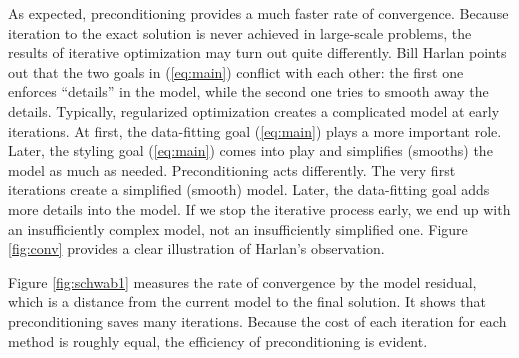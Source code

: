 As expected,
preconditioning provides a much faster rate of convergence.
Because iteration to the exact solution
is never achieved in large-scale problems,
the results of iterative optimization may turn out quite differently.
Bill Harlan points out that the two goals
in (\ref{eq:main}) conflict with each other:
the first one enforces ``details'' in the model,
while the second one tries to smooth away the details.
Typically, regularized optimization creates
a complicated model at early iterations.
At first, the data-fitting goal (\ref{eq:main}) plays a more important role.
Later, the styling goal (\ref{eq:main}) comes into play
and simplifies (smooths) the model as much as needed.
Preconditioning acts differently.
The very first iterations create a simplified (smooth) model.
Later, the data-fitting goal adds more details into the model.
If we stop the iterative process early,
we end up with an insufficiently complex model,
not an insufficiently simplified one.
Figure \ref{fig:conv} provides a clear illustration of Harlan's observation.

\par
Figure \ref{fig:schwab1}
measures the rate of convergence by the model residual,
which is a distance from the current model to the final solution.
It shows that preconditioning saves many iterations.
Because the cost of each iteration for each method is roughly equal,
the efficiency of preconditioning is evident.

\begin{comment}
\par
The module \texttt{invint2} \vpageref{lst:invint2}
invokes the solvers to make
Figures \ref{fig:conv}
and
\ref{fig:schwab1}.
We use convolution with
\texttt{helicon} \vpageref{lst:helicon}
for the regularization
and we use deconvolution with
\texttt{polydiv} \vpageref{lst:polydiv}
for the preconditioning.
The code looks fairly straightforward except for
the oxymoron
\texttt{known=aa\%mis}.

\moddex{invint2}{Inverse linear interpolation}        
\end{comment}

